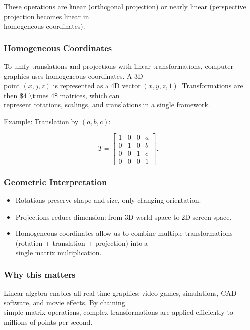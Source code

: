 \documentclass[
  12pt,
  a4paper,
]{article}
\begin{document}
These operations are linear (orthogonal projection) or nearly linear
(perspective projection becomes linear in\\
homogeneous coordinates).

\subsubsection{Homogeneous Coordinates}\label{homogeneous-coordinates}

To unify translations and projections with linear transformations,
computer graphics uses homogeneous coordinates. A 3D\\
point \((x,y,z)\) is represented as a 4D vector \((x,y,z,1)\).
Transformations are then \$4 \textbackslash times 4\$ matrices, which
can\\
represent rotations, scalings, and translations in a single framework.

Example: Translation by \((a,b,c)\):

\[T = \begin{bmatrix}
1 & 0 & 0 & a \\
0 & 1 & 0 & b \\
0 & 0 & 1 & c \\
0 & 0 & 0 & 1
\end{bmatrix}.\]

\subsubsection{Geometric
Interpretation}\label{geometric-interpretation-23}

\begin{itemize}
\item
  Rotations preserve shape and size, only changing orientation.
\item
  Projections reduce dimension: from 3D world space to 2D screen space.
\item
  Homogeneous coordinates allow us to combine multiple transformations
  (rotation + translation + projection) into a\\
  single matrix multiplication.
\end{itemize}

\subsubsection{Why this matters}\label{why-this-matters-36}

Linear algebra enables all real-time graphics: video games, simulations,
CAD software, and movie effects. By chaining\\
simple matrix operations, complex transformations are applied
efficiently to millions of points per second.
\end{document}
